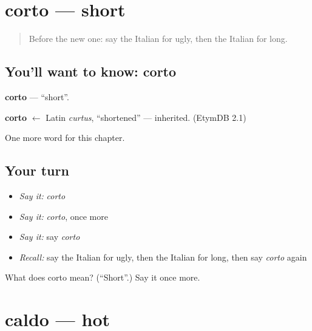 \section[corto]{corto — short}

\label{lesson:IT-C73-corto}



\begin{quote}
Before the new one: say the Italian for ugly, then the Italian for long.
\end{quote}

\subsection*{You'll want to know: corto}
\textbf{corto} — \textquotedblleft{}short\textquotedblright{}.

\begin{cousinweb}
\textbf{corto} $\leftarrow$ Latin \emph{curtus}, \textquotedblleft{}shortened\textquotedblright{} — inherited. (EtymDB 2.1)
\end{cousinweb}

\begin{grammarlens}[title={What you've built}]
One more word for this chapter.
\end{grammarlens}

\subsection*{Your turn}
\begin{itemize}
\raggedright
  \item \emph{Say it:} \emph{corto}
  \item \emph{Say it:} \emph{corto}, once more
  \item \emph{Say it:} say \emph{corto}
  \item \emph{Recall:} say the Italian for ugly, then the Italian for long, then say \emph{corto} again
\end{itemize}

\begin{tcolorbox}[breakable,colback=teal!4,colframe=teal!35!black,title={Before you move on}]
What does corto mean? (\textquotedblleft{}Short\textquotedblright{}.) Say it once more.
\end{tcolorbox}
\section[caldo]{caldo — hot}

